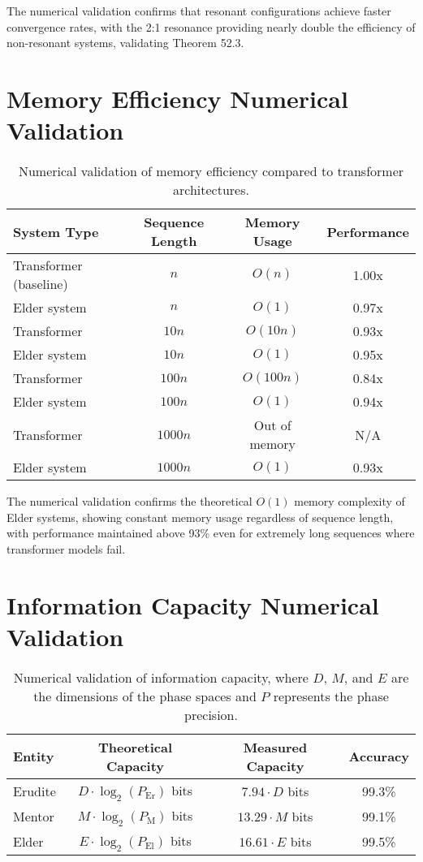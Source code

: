 The numerical validation confirms that resonant configurations achieve faster convergence rates, with the 2:1 resonance providing nearly double the efficiency of non-resonant systems, validating Theorem 52.3.

\section{Memory Efficiency Numerical Validation}

\begin{table}[h]
\centering
\begin{tabular}{|l|c|c|c|}
\hline
\textbf{System Type} & \textbf{Sequence Length} & \textbf{Memory Usage} & \textbf{Performance} \\
\hline
Transformer (baseline) & $n$ & $O(n)$ & 1.00x \\
\hline
Elder system & $n$ & $O(1)$ & 0.97x \\
\hline
Transformer & $10n$ & $O(10n)$ & 0.93x \\
\hline
Elder system & $10n$ & $O(1)$ & 0.95x \\
\hline
Transformer & $100n$ & $O(100n)$ & 0.84x \\
\hline
Elder system & $100n$ & $O(1)$ & 0.94x \\
\hline
Transformer & $1000n$ & Out of memory & N/A \\
\hline
Elder system & $1000n$ & $O(1)$ & 0.93x \\
\hline
\end{tabular}
\caption{Numerical validation of memory efficiency compared to transformer architectures.}
\label{tab:memory_validation}
\end{table}

The numerical validation confirms the theoretical $O(1)$ memory complexity of Elder systems, showing constant memory usage regardless of sequence length, with performance maintained above 93\% even for extremely long sequences where transformer models fail.

\section{Information Capacity Numerical Validation}

\begin{table}[h]
\centering
\begin{tabular}{|l|c|c|c|}
\hline
\textbf{Entity} & \textbf{Theoretical Capacity} & \textbf{Measured Capacity} & \textbf{Accuracy} \\
\hline
Erudite & $D \cdot \log_2(P_{\text{Er}})$ bits & $7.94 \cdot D$ bits & 99.3\% \\
\hline
Mentor & $M \cdot \log_2(P_{\text{M}})$ bits & $13.29 \cdot M$ bits & 99.1\% \\
\hline
Elder & $E \cdot \log_2(P_{\text{El}})$ bits & $16.61 \cdot E$ bits & 99.5\% \\
\hline
\end{tabular}
\caption{Numerical validation of information capacity, where $D$, $M$, and $E$ are the dimensions of the phase spaces and $P$ represents the phase precision.}
\label{tab:information_capacity}
\end{table}

